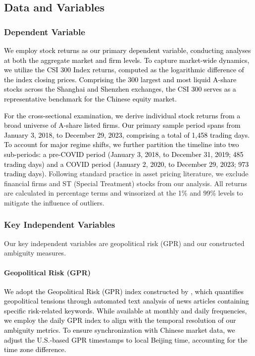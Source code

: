 \documentclass[preprint,12pt,authoryear]{elsarticle}
\begin{document}
\subsection{Data and Variables}

\subsubsection{Dependent Variable}

\textcolor{black}{We employ stock returns as our primary dependent variable, conducting analyses at both the aggregate market and firm levels. To capture market-wide dynamics, we utilize the CSI 300 Index returns, computed as the logarithmic difference of the index closing prices. Comprising the 300 largest and most liquid A-share stocks across the Shanghai and Shenzhen exchanges, the CSI 300 serves as a representative benchmark for the Chinese equity market.}

\textcolor{black}{For the cross-sectional examination, we derive individual stock returns from a broad universe of A-share listed firms.} \textcolor{black}{Our primary sample period spans from January 3, 2018, to December 29, 2023, comprising a total of 1,458 trading days. To account for major regime shifts, we further partition the timeline into two sub-periods: a pre-COVID period (January 3, 2018, to December 31, 2019; 485 trading days) and a COVID period (January 2, 2020, to December 29, 2023; 973 trading days).} Following standard practice in asset pricing literature, we exclude financial firms and ST (Special Treatment) stocks from our analysis. All returns are calculated in percentage terms and winsorized at the 1\% and 99\% levels to mitigate the influence of outliers.



\subsubsection{Key Independent Variables}

Our key independent variables are geopolitical risk (GPR) and our constructed ambiguity measures.

\paragraph{Geopolitical Risk (GPR)}
\textcolor{black}{We adopt the Geopolitical Risk (GPR) index constructed by \citet{Caldara2022}, which quantifies geopolitical tensions through automated text analysis of news articles containing specific risk-related keywords. While available at monthly and daily frequencies, we employ the daily GPR index to align with the temporal resolution of our ambiguity metrics. To ensure synchronization with Chinese market data, we adjust the U.S.-based GPR timestamps to local Beijing time, accounting for the time zone difference.}
\end{document}
